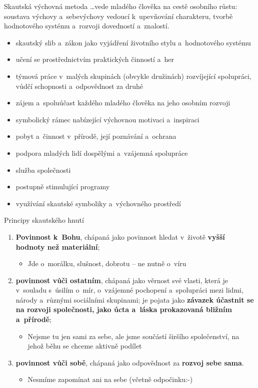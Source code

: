 \documentclass[compress,xelatex,xcolor=dvipsnames,print]{beamer}
\begin{document}
\begin{frame}{Skautská výchovná metoda}
\ldots vede mladého člověka na cestě osobního růstu: soustava výchovy a~sebevýchovy vedoucí k~upevňování charakteru, tvorbě hodnotového systému a~rozvoji dovedností a~znalostí.
\begin{itemize}
\item skautský slib a~zákon jako vyjádření životního stylu a~hodnotového systému
\item učení se prostřednictvím praktických činností a~her
\item týmová práce v~malých skupinách (obvykle družinách) rozvíjející spolupráci, vůdčí schopnosti a~odpovědnost za druhé
\item zájem a~spoluúčast každého mladého člověka na jeho osobním rozvoji
\item symbolický rámec nabízející výchovnou motivaci a~inspiraci
\item pobyt a~činnost v~přírodě, její poznávání a~ochrana
\item podpora mladých lidí dospělými a~vzájemná spolupráce
\item služba společnosti
\item postupně stimulující programy
\item využívání skautské symboliky a~výchovného prostředí
\end{itemize}
\end{frame}

\begin{frame}{Principy skautského hnutí}
\begin{enumerate}
\item \textbf{Povinnost k~Bohu}, chápaná jako povinnost hledat v~životě \textbf{vyšší hodnoty než materiální};
 \begin{itemize}
 \item Jde o~morálku, slušnost, dobrotu -- ne nutně o~víru
 \end{itemize}
\item \textbf{povinnost vůči ostatním}, chápaná jako věrnost své vlasti, která je v~souladu s~úsilím o~mír, o~vzájemné pochopení a~spolupráci mezi lidmi, národy a~různými sociálními skupinami; je pojata jako 	\textbf{závazek účastnit se na rozvoji společnosti, jako úcta a~láska prokazovaná bližním a~přírodě};
 \begin{itemize}
 \item Nejsme tu jen sami za sebe, ale jsme součástí širšího společenství, na jehož běhu se chceme aktivně podílet
 \end{itemize}
\item \textbf{povinnost vůči sobě}, chápaná jako odpovědnost za \textbf{rozvoj sebe sama}.
 \begin{itemize}
 \item Nesmíme zapomínat ani na sebe (včetně odpočinku:-)
 \end{itemize}
\end{enumerate}
\end{frame}
\end{document}
